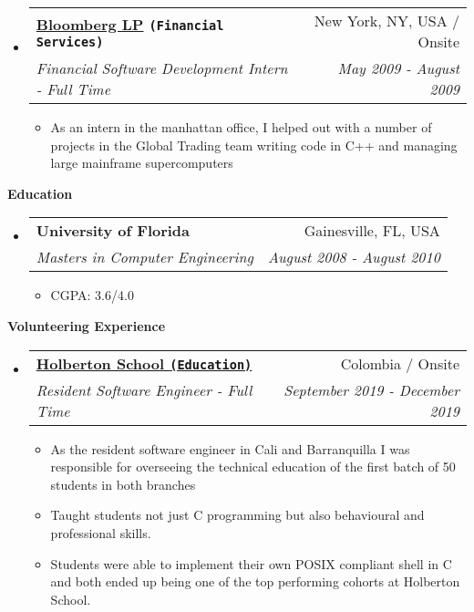 \documentclass[letterpaper,11pt]{article}
\makeatletter
\newcommand{\resitem}[1]{\item #1 \vspace{-2pt}}
\newcommand{\resheading}[1]{{\large \colorbox{mygrey}{\begin{minipage}{\textwidth}{\textbf{#1 \vphantom{p\^{E}}}}\end{minipage}}}}
\newcommand{\ressubheading}[4]{
\begin{tabular*}{7.0in}{l@{\extracolsep{\fill}}r}
    \textbf{#1} & #2 \\
    \textit{#3} & \textit{#4} \\
\end{tabular*}\vspace{-6pt}}
\makeatother
\begin{document}
\begin{itemize}
\item
    \ressubheading{\href{http://www.bloomberg.com}{Bloomberg LP} \texttt{(Financial Services)}}{New York, NY, USA / Onsite}{Financial Software Development Intern - Full Time}{May 2009 - August 2009}
    \begin{itemize}
      \resitem{As an intern in the manhattan office, I helped out with a number of projects in the Global Trading team writing code in C++ and managing large mainframe supercomputers}
    \end{itemize}
    
    
\end{itemize}

\vspace{0.3in}
  
\resheading{Education}
\begin{itemize}
\item
    \ressubheading{University of Florida}{Gainesville, FL, USA}{{Masters in Computer Engineering}}{August 2008 - August 2010}
    \begin{itemize}
        \resitem{CGPA: 3.6/4.0}
    \end{itemize}
\end{itemize}

\vspace{0.3in}

\resheading{Volunteering Experience}
\begin{itemize}

\item
    \ressubheading{\href{https://www.holbertonschool.com/}{Holberton School \texttt{(Education)}}}{Colombia / Onsite}{Resident Software Engineer - Full Time}{September 2019 - December 2019}
    \begin{itemize}
        \resitem{As the resident software engineer in Cali and Barranquilla I was responsible for overseeing the technical education of the first batch of 50 students in both branches}
        \resitem{Taught students not just C programming but also behavioural and professional skills.}
        \resitem{Students were able to implement their own POSIX compliant shell in C and both ended up being one of the top performing cohorts at Holberton School.}
    \end{itemize}

\end{itemize}
\end{document}
